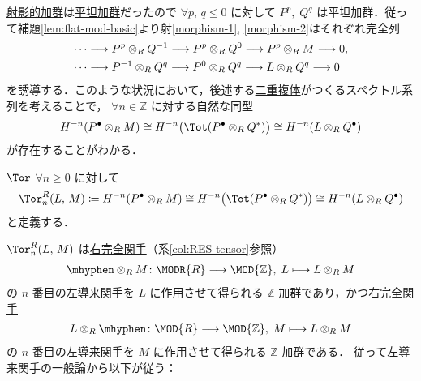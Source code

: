 \documentclass[algtopo_main]{subfiles}
\begin{document}
\hyperref[def:proj-mod]{射影的加群}は\hyperref[def:flat-mod]{平坦加群}だったので $\forall p,\, q \le 0$ に対して $P^p,\; Q^q$ は平坦加群．従って補題\ref{lem:flat-mod-basic}より射\eqref{morphism-1}, \eqref{morphism-2}はそれぞれ完全列
\begin{align}
    \cdots &\longrightarrow P^p \otimes_R Q^{-1} \longrightarrow P^p \otimes_R Q^0 \longrightarrow P^p \otimes_R M \longrightarrow 0,\\
    \cdots &\longrightarrow P^{-1} \otimes_R Q^{q} \longrightarrow P^0 \otimes_R Q^q \longrightarrow L \otimes_R Q^q \longrightarrow 0
\end{align}
を誘導する．このような状況において，後述する\hyperref[def:double-complex]{二重複体}がつくるスペクトル系列を考えることで， 
$\forall n \in \mathbb{Z}$ に対する自然な同型
\begin{align}
    \label{eq:spectral-isom-Tor}
    H^{-n}(P^\bullet \otimes_R M) \cong H^{-n} \bigl( \Tot(P^\bullet \otimes_R Q^*) \bigr) \cong H^{-n} (L \otimes_R Q^\bullet)
\end{align}
が存在することがわかる．

\begin{mydef}[label=def:Tor]{$\Tor$}
    $\forall n \ge 0$ に対して
    \begin{align}
        \Tor^R_n (L,\, M) \coloneqq H^{-n}(P^\bullet \otimes_R M) \cong H^{-n} \bigl( \Tot(P^\bullet \otimes_R Q^*) \bigr) \cong H^{-n} (L \otimes_R Q^\bullet)
    \end{align}
    と定義する．
\end{mydef}


$\Tor^R_n(L,\, M)$ は\hyperref[def:Ab-func]{右完全関手}（系\ref{col:RES-tensor}参照）
\begin{align}
    \mhyphen \otimes_R M \colon \MODR{R} \lto \MOD{\mathbb{Z}},\; L \lmto L \otimes_R M
\end{align}
の $n$ 番目の左導来関手を $L$ に作用させて得られる $\mathbb{Z}$ 加群であり，かつ\hyperref[def:Ab-func]{右完全関手}
\begin{align}
    L \otimes_R \mhyphen \colon \MOD{R} \lto \MOD{\mathbb{Z}},\; M \lmto L \otimes_R M
\end{align}
の $n$ 番目の左導来関手を $M$ に作用させて得られる $\mathbb{Z}$ 加群である．
従って左導来関手の一般論から以下が従う：
\end{document}

